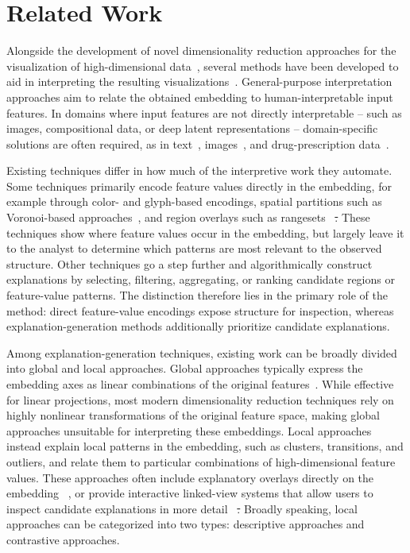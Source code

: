 \documentclass[lettersize,journal]{IEEEtran}
\makeatletter
\providecommand{\DIFadd}[1]{{\protect\color{blue}\uwave{#1}}} %
\providecommand{\DIFdel}[1]{{\protect\color{red}\sout{#1}}} %
\providecommand{\DIFaddbegin}{} %
\providecommand{\DIFaddend}{} %
\providecommand{\DIFdelbegin}{} %
\providecommand{\DIFdelend}{} %
\providecommand{\DIFscaledelfig}{0.5}
\newlength{\DIFdelgraphicswidth} %
\newlength{\DIFdelgraphicsheight} %
\providecommand{\DIFaddincludegraphics}[2][]{{\color{blue}\fbox{\DIFOincludegraphics[#1]{#2}}}} %
\providecommand{\DIFdelincludegraphics}[2][]{%
\sbox{\DIFdelgraphicsbox}{\DIFOincludegraphics[#1]{#2}}%
\settoboxwidth{\DIFdelgraphicswidth}{\DIFdelgraphicsbox} %
\settoboxtotalheight{\DIFdelgraphicsheight}{\DIFdelgraphicsbox} %
\scalebox{\DIFscaledelfig}{%
\parbox[b]{\DIFdelgraphicswidth}{\usebox{\DIFdelgraphicsbox}\\[-\baselineskip] \rule{\DIFdelgraphicswidth}{0em}}\llap{\resizebox{\DIFdelgraphicswidth}{\DIFdelgraphicsheight}{%
\setlength{\unitlength}{\DIFdelgraphicswidth}%
\begin{picture}(1,1)%
\thicklines\linethickness{2pt} %
{\color[rgb]{1,0,0}\put(0,0){\framebox(1,1){}}}%
{\color[rgb]{1,0,0}\put(0,0){\line( 1,1){1}}}%
{\color[rgb]{1,0,0}\put(0,1){\line(1,-1){1}}}%
\end{picture}%
}\hspace*{3pt}}} %
} %
\DeclareRobustCommand{\DIFaddbegin}{\DIFOaddbegin \let\includegraphics\DIFaddincludegraphics} %
\DeclareRobustCommand{\DIFaddend}{\DIFOaddend \let\includegraphics\DIFOincludegraphics} %
\DeclareRobustCommand{\DIFdelbegin}{\DIFOdelbegin \let\includegraphics\DIFdelincludegraphics} %
\DeclareRobustCommand{\DIFdelend}{\DIFOaddend \let\includegraphics\DIFOincludegraphics} %
\let\sout@orig\sout %
\renewcommand{\sout}[1]{\ifmmode\text{\sout@orig{\ensuremath{#1}}}\else\sout@orig{#1}\fi} %
\makeatother
\begin{document}
\section{Related Work}
\label{sec:related_work}

Alongside the development of novel dimensionality reduction approaches for the visualization of high-dimensional data~\cite{Kruskal1978,Maaten2008,McInnes2018}, several methods have been developed to aid in interpreting the resulting visualizations~\cite{ChengMueller2016,Marcilio2021,Fujiwara2020}.
General-purpose interpretation approaches aim to relate the obtained embedding to human-interpretable input features.
In domains where input features are not directly interpretable -- such as images, compositional data, or deep latent representations -- domain-specific solutions are often required, as in text~\cite{Heimerl2016,WangHohmanChau2023}, images~\cite{Liu2019,Ye2024}, and drug-prescription data~\cite{Policar2023}.

Existing techniques differ in how much of the interpretive work they automate.
Some techniques primarily encode feature values directly in the embedding, for example through color- and glyph-based encodings, spatial partitions such as Voronoi-based approaches~\cite{Broeksema2013}, and region overlays such as rangesets~\cite{Sohns2022} \DIFdelbegin \DIFdel{. }\DIFdelend \DIFaddbegin \DIFadd{(Fig.~\ref{fig:related_methods}.e). }\DIFaddend These techniques show where feature values occur in the embedding, but largely leave it to the analyst to determine which patterns are most relevant to the observed structure.
Other techniques go a step further and algorithmically construct explanations by selecting, filtering, aggregating, or ranking candidate regions or feature-value patterns.
The distinction therefore lies in the primary role of the method: direct feature-value encodings expose structure for inspection, whereas explanation-generation methods additionally prioritize candidate explanations.

Among explanation-generation techniques, existing work can be broadly divided into global and local approaches.
Global approaches typically express the embedding axes as linear combinations of the original features~\cite{Broeksema2013,Coimbra2016}.
While effective for linear projections, most modern dimensionality reduction techniques rely on highly nonlinear transformations of the original feature space, making global approaches unsuitable for interpreting these embeddings.
Local approaches instead explain local patterns in the embedding, such as clusters, transitions, and outliers, and relate them to particular combinations of high-dimensional feature values.
These approaches often include explanatory overlays directly on the embedding~\cite{Joia2015,ChengMueller2016,Tian2021} \DIFaddbegin \DIFadd{(Fig.~\ref{fig:related_methods}.e--g)}\DIFaddend , or provide interactive linked-view systems that allow users to inspect candidate explanations in more detail~\cite{Kandogan2012,Stahnke2016,Bibal2021} \DIFdelbegin \DIFdel{.
}\DIFdelend \DIFaddbegin \DIFadd{(Fig.~\ref{fig:related_methods}.b--d).
}\DIFaddend Broadly speaking, local approaches can be categorized into two types: descriptive approaches and contrastive approaches.
\end{document}
